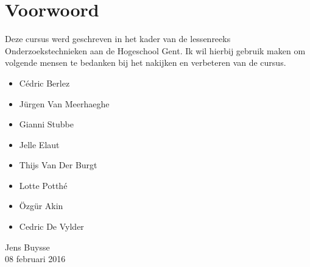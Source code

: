 

\chapter*{Voorwoord}
Deze cursus werd geschreven in het kader van de lessenreeks Onderzoekstechnieken aan de Hogeschool Gent. Ik wil hierbij gebruik maken om volgende mensen te bedanken bij het nakijken en verbeteren van de cursus.
\begin{itemize}
	\item C\'edric Berlez
	\item J\"urgen Van Meerhaeghe
	\item Gianni Stubbe
	\item Jelle Elaut
	\item Thijs Van Der Burgt
	\item Lotte Potth\'e
	\item \"Ozg\"ur Akin
	\item Cedric De Vylder
\end{itemize}

\bigskip \bigskip
{\raggedleft	%
Jens Buysse\\
08 februari 2016\\
}
